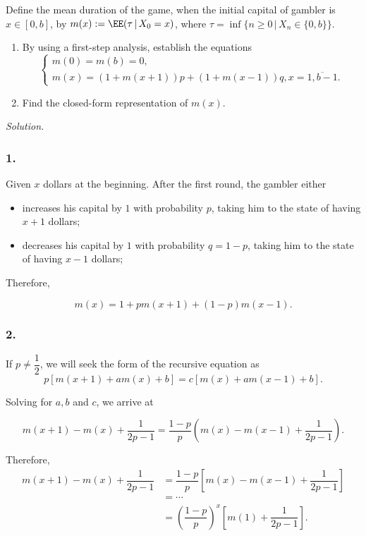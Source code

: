 Define the mean duration of the game, when the initial capital of gambler is $x\in[0, b]$, by
$m(x) := \EE(\tau \,|\, X_0 = x)$, where $\tau = \inf\{n \ge 0 \,|\, X_n\in\{0, b\}\}$.

\begin{enumerate}
    \item By using a first-step analysis, establish the equations
    $$\begin{cases}
        m(0) = m(b) = 0,\\
        m(x) = (1+m(x+1))p +(1+m(x-1))q, x=\overline{1,b-1}.
    \end{cases}$$
    \item Find the closed-form representation of $m(x)$.
\end{enumerate}

\textit{Solution.}

\subsubsection*{1.} Given $x$ dollars at the beginning. After the first round, the gambler either
\begin{itemize}
    \item increases his capital by $1$ with probability $p$, taking him to the state of having $x+1$ dollars;
    \item decreases his capital by $1$ with probability $q=1-p$, taking him to the state of having $x-1$ dollars;
\end{itemize}

Therefore,

$$m(x) = 1 + pm(x+1) + (1-p)m(x-1).$$

\subsubsection*{2.} If $p\ne\dfrac{1}{2}$, we will seek the form of the recursive equation as
$$p[m(x+1)+am(x)+b] = c[m(x)+am(x-1)+b].$$

Solving for $a,b$ and $c$, we arrive at

$$m(x+1)-m(x)+\dfrac{1}{2p-1} = \dfrac{1-p}{p}(m(x)-m(x-1)+\dfrac{1}{2p-1}).$$

Therefore, 
\begin{align*}
    m(x+1)-m(x)+\dfrac{1}{2p-1} 
    &= \dfrac{1-p}{p}\left[m(x)-m(x-1)+\dfrac{1}{2p-1}\right] \\
    &= \cdots \\
    &= \left(\dfrac{1-p}{p}\right)^x\left[m(1)+\dfrac{1}{2p-1}\right].
\end{align*}

